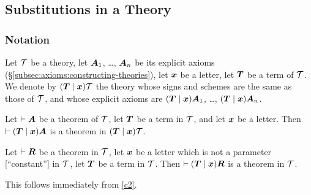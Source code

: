 \subsection{Substitutions in a Theory}

\subsubsection{Notation}
Let $\mathcal{T}$ be a theory, let $\boldsymbol{A}_{1}$, \dots,
$\boldsymbol{A}_{n}$ be its explicit axioms (\S\ref{subsec:axioms:constructing-theories}),
let $\boldsymbol{x}$ be a letter, let $\boldsymbol{T}$ be a term of
$\mathcal{T}$. We denote by
$(\boldsymbol{T}\mid\boldsymbol{x})\mathcal{T}$ the theory whose
signs and schemes are the same as those of $\mathcal{T}$, and whose
explicit axioms are
$(\boldsymbol{T}\mid\boldsymbol{x})\boldsymbol{A}_{1}$, \dots,
$(\boldsymbol{T}\mid\boldsymbol{x})\boldsymbol{A}_{n}$.

\begin{dc}\label{c2}%
Let $\vdash\boldsymbol{A}$ be a theorem of $\mathcal{T}$,
let $\boldsymbol{T}$ be a term in $\mathcal{T}$,
and let $\boldsymbol{x}$ be a letter. Then $\vdash(\boldsymbol{T}\mid\boldsymbol{x})\boldsymbol{A}$
is a theorem in $(\boldsymbol{T}\mid\boldsymbol{x})\mathcal{T}$.
\end{dc}

\begin{dc}\label{c3}%
Let $\vdash\boldsymbol{R}$ be a theorem in $\mathcal{T}$, let
$\boldsymbol{x}$ be a letter which is not a parameter [``constant'']
in $\mathcal{T}$, let $\boldsymbol{T}$ be a term in $\mathcal{T}$.
Then $\vdash(\boldsymbol{T}\mid\boldsymbol{x})\boldsymbol{R}$ is a
theorem in $\mathcal{T}$.
\end{dc}

This follows immediately from \ref{c2}.
